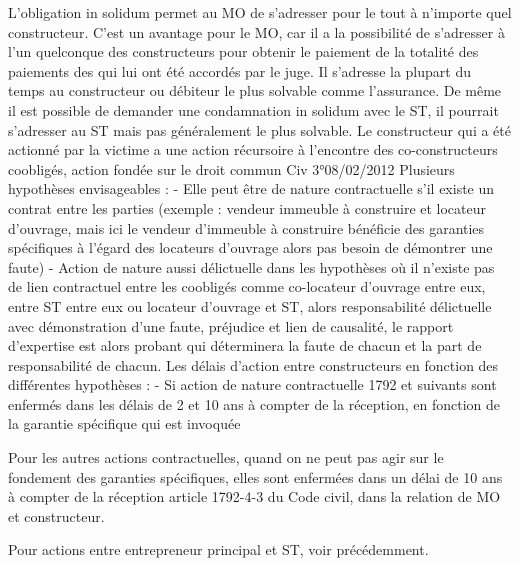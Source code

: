 			L’obligation in solidum permet au MO de s’adresser pour le tout à n’importe quel constructeur. C’est un avantage pour le MO, car il a la possibilité de s’adresser à l’un quelconque des constructeurs pour obtenir le paiement de la totalité des paiements des \DI qui lui ont été accordés par le juge. Il s’adresse la plupart du temps au constructeur ou débiteur le plus solvable comme l’assurance. De même il est possible de demander une condamnation in solidum avec le ST, il pourrait s’adresser au ST mais pas généralement le plus solvable.
			Le constructeur qui a été actionné par la victime a une action récursoire à l’encontre des co-constructeurs coobligés, action fondée sur le droit commun Civ 3°08/02/2012
			Plusieurs hypothèses envisageables :
			-	Elle peut être de nature contractuelle s’il existe un contrat entre les parties (exemple : vendeur immeuble à construire et locateur d’ouvrage, mais ici le vendeur d’immeuble à construire bénéficie des garanties spécifiques à l’égard des locateurs d’ouvrage alors pas besoin de démontrer une faute)
			-	Action de nature aussi délictuelle dans les hypothèses où il n’existe pas de lien contractuel entre les coobligés comme co-locateur d’ouvrage entre eux, entre ST entre eux ou locateur d’ouvrage et ST, alors responsabilité délictuelle avec démonstration d’une faute, préjudice et lien de causalité, le rapport d’expertise est alors probant qui déterminera la faute de chacun et la part de responsabilité de chacun.
			Les délais d’action entre constructeurs en fonction des différentes hypothèses :
			-	Si action de nature contractuelle 1792 et suivants sont enfermés dans les délais de 2 et 10 ans à compter de la réception, en fonction de la garantie spécifique qui est invoquée

			Pour les autres actions contractuelles, quand on ne peut pas agir sur le fondement des garanties spécifiques, elles sont enfermées dans un délai de 10 ans à compter de la réception article 1792-4-3 du Code civil, dans la relation de MO et constructeur.

			Pour actions entre entrepreneur principal et ST, voir précédemment.

